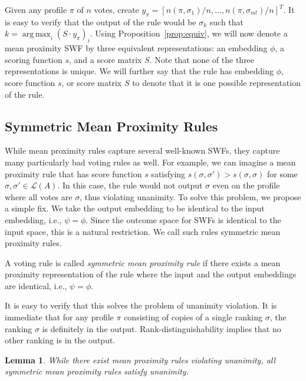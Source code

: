 \documentclass[10pt,letterpaper]{article}
\newcommand{\calL}{{\mathcal{L}}}
\newcommand{\rank}{{\calL(A)}}
\DeclareMathOperator*{\argmax}{arg\,max}
\newtheorem{lemma}{Lemma}
\newenvironment{definition}[1][Definition]{\begin{trivlist}
\item[\hskip \labelsep {\bfseries #1}]}{\end{trivlist}}
\begin{document}
Given any profile $\pi$ of $n$ votes, create $y_{\pi} = [n(\pi,\sigma_1)/n,\ldots,n(\pi,\sigma_{m!})/n]^T$. It is easy to verify that the output of the rule would be $\sigma_k$ such that $k = \argmax_i (S\cdot y_{\pi})_i$. Using Proposition~\ref{prop:equiv}, we will now denote a mean proximity SWF by three equivalent representations: an embedding $\phi$, a scoring function $s$, and a score matrix $S$. Note that none of the three representations is unique. We will further say that the rule has embedding $\phi$, score function $s$, or score matrix $S$ to denote that it is one possible representation of the rule.


\subsection{Symmetric Mean Proximity Rules}

While mean proximity rules capture several well-known SWFs, they capture many particularly bad voting rules as well. For example, we can imagine a mean proximity rule that has score function $s$ satisfying $s(\sigma,\sigma') > s(\sigma,\sigma)$ for some $\sigma,\sigma' \in \rank$. In this case, the rule would not output $\sigma$ even on the profile where all votes are $\sigma$, thus violating unanimity. To solve this problem, we propose a simple fix. We take the output embedding to be identical to the input embedding, i.e., $\psi = \phi$. Since the outcome space for SWFs is identical to the input space, this is a natural restriction. We call such rules symmetric mean proximity rules.

\begin{definition}[Symmetric Mean Proximity Rules]
A voting rule is called \emph{symmetric mean proximity rule} if there exists a mean proximity representation of the rule where the input and the output embeddings are identical, i.e., $\psi = \phi$. 
\end{definition} 

It is easy to verify that this solves the problem of unanimity violation. It is immediate that for any profile $\pi$ consisting of copies of a single ranking $\sigma$, the ranking $\sigma$ is definitely in the output. Rank-distinguishability implies that no other ranking is in the output.


\begin{lemma}
While there exist mean proximity rules violating unanimity, all symmetric mean proximity rules satisfy unanimity.
\end{lemma}
\end{document}
